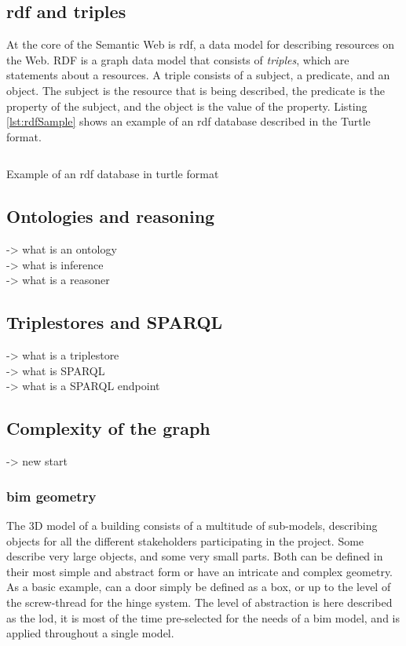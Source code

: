 \subsection{\acs{rdf} and triples}
At the core of the Semantic Web is \ac{rdf}, a data model for describing resources on the Web. RDF is a graph data model that consists of \emph{triples}, which are statements about a resources. A triple consists of a subject, a predicate, and an object. The subject is the resource that is being described, the predicate is the property of the subject, and the object is the value of the property. Listing \ref{lst:rdfSample} shows an example of an \ac{rdf} database described in the Turtle format.

\begin{listing}
	\inputminted{turtle}{figures/snippets/rdfSample.ttl}
	\vspace{-0.7cm}
	\caption{Example of an \ac{rdf} database in turtle format}
	\label{lst:rdfSample}
\end{listing}



\subsection{Ontologies and reasoning}
-> what is an ontology\\
-> what is inference\\
-> what is a reasoner

\subsection{Triplestores and SPARQL}
-> what is a triplestore\\
-> what is SPARQL\\
-> what is a SPARQL endpoint

\subsection{Complexity of the graph}
-> new start
\subsubsection{\ac{bim} geometry} \label{subsec:bimGeometry}
The 3D model of a building consists of a multitude of sub-models, describing objects for all the different stakeholders participating in the project. Some describe very large objects, and some very small parts. Both can be defined in their most simple and abstract form or have an intricate and complex geometry. As a basic example, can a door simply be defined as a box, or up to the level of the screw-thread for the hinge system. The level of abstraction is here described as the \ac{lod}, it is most of the time pre-selected for the needs of a \ac{bim} model, and is applied throughout a single model.

